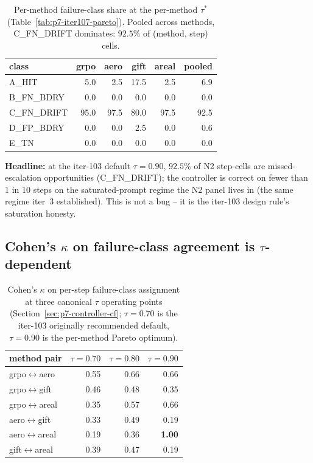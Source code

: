 \documentclass{article}
\begin{document}
\begin{table}[t]
\centering\small
\caption{Per-method failure-class share at the per-method $\tau^*$ (Table~\ref{tab:p7-iter107-pareto}).  Pooled across methods,
C\_FN\_DRIFT dominates: $92.5\%$ of (method, step) cells.}
\label{tab:p7-iter107-failshare}
\vspace{2pt}
\begin{tabular}{lrrrrr}
\toprule
class & grpo & aero & gift & areal & pooled \\
\midrule
A\_HIT       &  5.0 &  2.5 & 17.5 &  2.5 &  6.9 \\
B\_FN\_BDRY  &  0.0 &  0.0 &  0.0 &  0.0 &  0.0 \\
C\_FN\_DRIFT & 95.0 & 97.5 & 80.0 & 97.5 & 92.5 \\
D\_FP\_BDRY  &  0.0 &  0.0 &  2.5 &  0.0 &  0.6 \\
E\_TN        &  0.0 &  0.0 &  0.0 &  0.0 &  0.0 \\
\bottomrule
\end{tabular}
\end{table}

\textbf{Headline:} at the iter-103 default $\tau{=}0.90$, $92.5\%$ of N2
step-cells are missed-escalation opportunities (C\_FN\_DRIFT); the
controller is correct on fewer than 1 in 10 steps on the saturated-prompt
regime the N2 panel lives in (the same regime iter~3 established).  This is
not a bug -- it is the iter-103 design rule's saturation honesty.

\subsection{Cohen's $\kappa$ on failure-class agreement is $\tau$-dependent}

\begin{table}[t]
\centering\small
\caption{Cohen's $\kappa$ on per-step failure-class assignment at three
canonical $\tau$ operating points (Section~\ref{sec:p7-controller-cf};
$\tau{=}0.70$ is the iter-103 originally recommended default,
$\tau{=}0.90$ is the per-method Pareto optimum).}
\label{tab:p7-iter107-kappa}
\vspace{2pt}
\begin{tabular}{lrrr}
\toprule
method pair & $\tau{=}0.70$ & $\tau{=}0.80$ & $\tau{=}0.90$ \\
\midrule
grpo$\leftrightarrow$aero   &  0.55  &  0.66  &  0.66 \\
grpo$\leftrightarrow$gift   &  0.46  &  0.48  &  0.35 \\
grpo$\leftrightarrow$areal  &  0.35  &  0.57  &  0.66 \\
aero$\leftrightarrow$gift   &  0.33  &  0.49  &  0.19 \\
aero$\leftrightarrow$areal  &  0.19  &  0.36  &  \textbf{1.00} \\
gift$\leftrightarrow$areal  &  0.39  &  0.47  &  0.19 \\
\bottomrule
\end{tabular}
\end{table}
\end{document}
